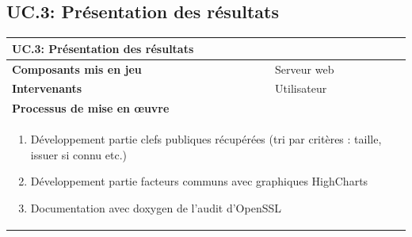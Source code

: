 \documentclass[a4paper,11pt,french]{article}
\begin{document}
\subsection{UC.3: Présentation des résultats}
\begin{center}
	\vspace*{0.7cm}
	\begin{tabularx}{16cm}{|l|X|}
	\hline
	\multicolumn{2}{|l|}{\textbf{UC.3: Présentation des résultats}}\\
	\hline
	\textbf{Composants mis en jeu} & Serveur web\\
	\hline
	\textbf{Intervenants} & Utilisateur\\
	\hline
	\multicolumn{2}{|l|}{\textbf{Processus de mise en \oe uvre}}\\
	\hline
	\multicolumn{2}{|p{15cm}|}{
	\begin{enumerate} 
	\item Développement partie clefs publiques récupérées (tri par critères : taille, issuer si connu etc.)
	\item Développement partie facteurs communs avec graphiques HighCharts
	\item Documentation avec doxygen de l'audit d'OpenSSL
	\end{enumerate}
	}\\
	\hline
	\end{tabularx}
\end{center}

\begin{center}

\end{center}
\end{document}
